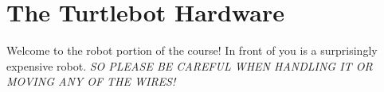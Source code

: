 \section{The Turtlebot Hardware}

Welcome to the robot portion of the course! In front of you is a surprisingly expensive robot. \textit{SO PLEASE BE CAREFUL WHEN HANDLING IT OR MOVING ANY OF THE WIRES!}